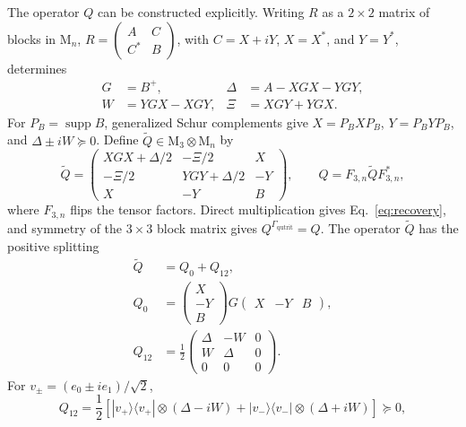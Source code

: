 \documentclass[aps,prl,reprint,superscriptaddress,nofootinbib]{revtex4-2}
\newcommand{\M}{\mathrm{M}}
\newcommand{\C}{\mathbb C}
\newcommand{\supp}{\operatorname{supp}}
\begin{document}
The operator $Q$ can be constructed explicitly.  Writing $R$ as a
$2\times2$ matrix of blocks in $\M_n$,
$R=\left(\begin{smallmatrix}A&C\\C^*&B\end{smallmatrix}\right)$, with
$C=X+iY$, $X=X^*$, and $Y=Y^*$, determines
\begin{equation}
 \begin{aligned}
 G&=B^+,& \Delta&=A-XGX-YGY,\\[-1mm]
 W&=YGX-XGY,& \Xi&=XGY+YGX.
 \end{aligned}
\label{eq:auxiliaryblocks}
\end{equation}
For $P_B=\supp B$, generalized Schur complements give
$X=P_BXP_B$, $Y=P_BYP_B$, and $\Delta\pm iW\succeq0$.  Define
$\widetilde Q\in\M_3\otimes\M_n$ by
\begin{equation}
 \widetilde Q=
 \begin{pmatrix}
  XGX+\Delta/2&-\Xi/2&X\\
  -\Xi/2&YGY+\Delta/2&-Y\\
  X&-Y&B
 \end{pmatrix},\qquad
 Q=F_{3,n}\widetilde QF_{3,n}^*,
\label{eq:auxiliaryQ}
\end{equation}
where $F_{3,n}$ flips the tensor factors.  Direct multiplication gives
Eq.~\eqref{eq:recovery}, and symmetry of the $3\times3$ block matrix gives
$Q^{\Gamma_{\mathrm{qutrit}}}=Q$.  The operator $\widetilde Q$ has the
positive splitting
\begin{align}
 \widetilde Q&=Q_0+Q_{12},
\nonumber\\[-1mm]
 Q_0&=\begin{pmatrix}X\\-Y\\B\end{pmatrix}
 G\begin{pmatrix}X&-Y&B\end{pmatrix},
\nonumber\\
 Q_{12}&=\frac12\begin{pmatrix}
  \Delta&-W&0\\ W&\Delta&0\\0&0&0
 \end{pmatrix}.
\label{eq:Qsplit}
\end{align}
For $v_\pm=(e_0\pm i e_1)/\sqrt2$,
\begin{equation}
 Q_{12}=\frac12\left[
 |v_+\rangle\langle v_+|\otimes(\Delta-iW)
 +|v_-\rangle\langle v_-|\otimes(\Delta+iW)
 \right]\succeq0,
\label{eq:Q12decomp}
\end{equation}
\end{document}
